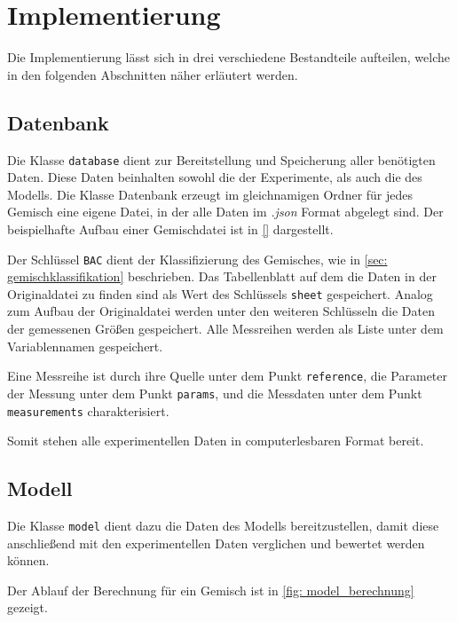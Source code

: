 \documentclass[../thesis.tex]{subfiles}
\begin{document}
\chapter{Implementierung}
\label{chp: implementierung}

Die Implementierung lässt sich in drei verschiedene Bestandteile aufteilen, welche in den folgenden Abschnitten näher erläutert werden.

\section{Datenbank}

Die Klasse \texttt{database} dient zur Bereitstellung und Speicherung aller benötigten Daten. Diese Daten beinhalten sowohl die der Experimente, als auch die des Modells. Die Klasse Datenbank erzeugt im gleichnamigen Ordner für jedes Gemisch eine eigene Datei, in der alle Daten im \textit{.json} Format abgelegt sind. Der beispielhafte Aufbau einer Gemischdatei ist in \autoref{} dargestellt.



Der Schlüssel \texttt{BAC} dient der Klassifizierung des Gemisches, wie in \autoref{sec: gemischklassifikation} beschrieben. Das Tabellenblatt auf dem die Daten in der Originaldatei zu finden sind als Wert des Schlüssels \texttt{sheet} gespeichert. Analog zum Aufbau der Originaldatei werden unter den weiteren Schlüsseln die Daten der gemessenen Größen gespeichert. Alle Messreihen werden als Liste unter dem Variablennamen gespeichert.

Eine Messreihe ist durch ihre Quelle unter dem Punkt \texttt{reference}, die Parameter der Messung unter dem Punkt \texttt{params}, und die Messdaten unter dem Punkt \texttt{measurements} charakterisiert.

Somit stehen alle experimentellen Daten in computerlesbaren Format bereit.

\section{Modell}

Die Klasse \texttt{model} dient dazu die Daten des Modells bereitzustellen, damit diese anschließend mit den experimentellen Daten verglichen und bewertet werden können.

Der Ablauf der Berechnung für ein Gemisch ist in \autoref{fig: model_berechnung} gezeigt.
\end{document}

